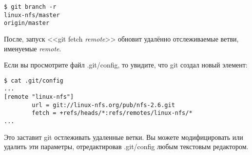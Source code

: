 \documentclass[a4paper, 12pt]{report}
\begin{document}
\begin{lstlisting}
$ git branch -r
linux-nfs/master
origin/master
\end{lstlisting}

После, запуск <<git fetch \emph{remote}>> обновит удалённо отслеживаемые ветви,
именуемые \emph{remote}.

Если вы просмотрите файл .git/config, то увидите, что git создал новый элемент:

\begin{lstlisting}
$ cat .git/config
...
[remote "linux-nfs"]
        url = git://linux-nfs.org/pub/nfs-2.6.git
        fetch = +refs/heads/*:refs/remotes/linux-nfs/*
...
\end{lstlisting}

Это заставит git остлеживать удаленные ветки. Вы можете модифицировать или удалить
эти параметры, отредактировав .git/config любым текстовым редактором.
%
%
\end{document}
